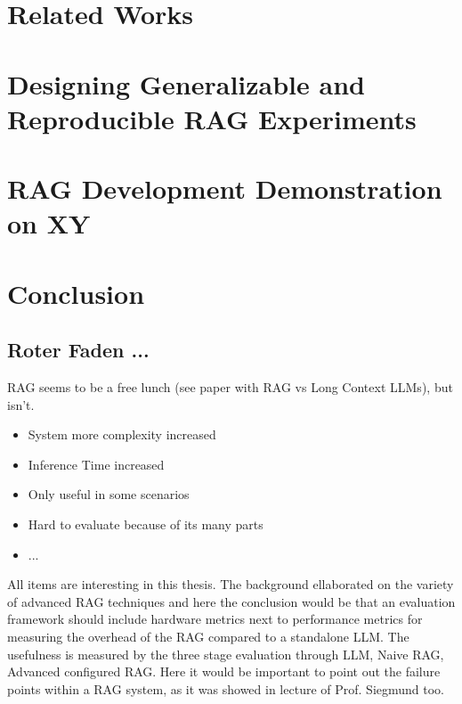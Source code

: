 \documentclass[english,master]{swsLeipzig}
\begin{document}
\chapter{Related Works}\label{chap:relwork}


\chapter{Designing Generalizable and Reproducible RAG Experiments}\label{chap:design}


\chapter{RAG Development Demonstration on XY}\label{chap:Experiment}


\chapter{Conclusion}\label{chap:Conclusion}


\section{Roter Faden ...}
RAG seems to be a free lunch (see paper with RAG vs Long Context LLMs), but isn't. 
\begin{itemize}
  \item System more complexity increased
  \item Inference Time increased
  \item Only useful in some scenarios 
  \item Hard to evaluate because of its many parts
  \item ...
\end{itemize}

All items are interesting in this thesis. The background ellaborated on the variety of advanced RAG techniques and here the conclusion would be that an evaluation framework should include hardware metrics next to performance metrics for measuring the overhead of the RAG compared to a standalone LLM. The usefulness is measured by the three stage evaluation through LLM, Naive RAG, Advanced configured RAG. Here it would be important to point out the failure points within a RAG system, as it was showed in lecture of Prof. Siegmund too. 
\appendix



\end{document}
